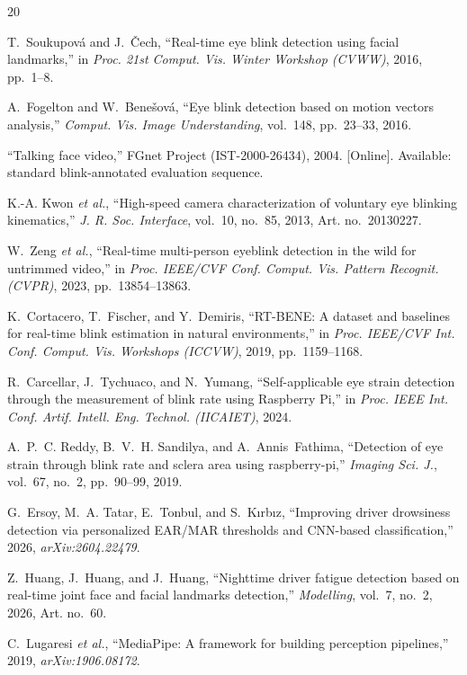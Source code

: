\documentclass{IEEE_lsens}
\begin{document}
\begin{thebibliography}{20}

T.~Soukupov\'a and J.~\v{C}ech, ``Real-time eye blink detection using facial
landmarks,'' in \emph{Proc. 21st Comput. Vis. Winter Workshop (CVWW)}, 2016,
pp.~1--8.

A.~Fogelton and W.~Bene\v{s}ov\'a, ``Eye blink detection based on motion vectors
analysis,'' \emph{Comput. Vis. Image Understanding}, vol.~148, pp.~23--33, 2016.

``Talking face video,'' FGnet Project (IST-2000-26434), 2004. [Online].
Available: standard blink-annotated evaluation sequence.

K.-A. Kwon \textit{et al.}, ``High-speed camera characterization of voluntary
eye blinking kinematics,'' \emph{J. R. Soc. Interface}, vol.~10, no.~85, 2013,
Art. no.~20130227.

W.~Zeng \textit{et al.}, ``Real-time multi-person eyeblink detection in the wild
for untrimmed video,'' in \emph{Proc. IEEE/CVF Conf. Comput. Vis. Pattern
Recognit. (CVPR)}, 2023, pp.~13854--13863.

K.~Cortacero, T.~Fischer, and Y.~Demiris, ``RT-BENE: A dataset and baselines for
real-time blink estimation in natural environments,'' in \emph{Proc. IEEE/CVF
Int. Conf. Comput. Vis. Workshops (ICCVW)}, 2019, pp.~1159--1168.

R.~Carcellar, J.~Tychuaco, and N.~Yumang, ``Self-applicable eye strain detection
through the measurement of blink rate using Raspberry Pi,'' in \emph{Proc. IEEE
Int. Conf. Artif. Intell. Eng. Technol. (IICAIET)}, 2024.

A.~P.~C. Reddy, B.~V.~H. Sandilya, and A.~Annis~Fathima, ``Detection of eye
strain through blink rate and sclera area using raspberry-pi,'' \emph{Imaging
Sci. J.}, vol.~67, no.~2, pp.~90--99, 2019.

G.~Ersoy, M.~A. Tatar, E.~Tonbul, and S.~K{\i}rb{\i}z, ``Improving driver
drowsiness detection via personalized EAR/MAR thresholds and CNN-based
classification,'' 2026, \emph{arXiv:2604.22479}.

Z.~Huang, J.~Huang, and J.~Huang, ``Nighttime driver fatigue detection based on
real-time joint face and facial landmarks detection,'' \emph{Modelling},
vol.~7, no.~2, 2026, Art. no.~60.

C.~Lugaresi \textit{et al.}, ``MediaPipe: A framework for building perception
pipelines,'' 2019, \emph{arXiv:1906.08172}.


\end{thebibliography}
\end{document}
